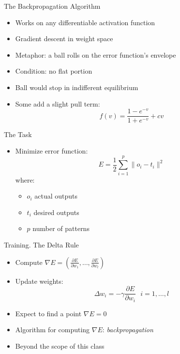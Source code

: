 \documentclass[size=14pt,
  style=tycja,
  paper=screen,
  ]{powerdot}
\begin{document}
\begin{slide}{The Backpropagation Algorithm}
  \begin{itemize}
  \item Works on any differentiable activation function
  \item Gradient descent in weight space
  \item Metaphor: a ball rolls on the error function's envelope
  \item Condition: no flat portion
  \item Ball would stop in indifferent equilibrium
  \item Some add a slight pull term:
  \begin{equation}
    f(v) = \displaystyle\frac{1 - e^{-v}}{1 + e^{-v}} + c v
  \end{equation}
  \end{itemize}
\end{slide}

\begin{slide}{The Task}
  \begin{itemize}
  \item Minimize error function:
    \begin{equation}
      E = \frac{1}{2}\displaystyle\sum_{i=1}^{p}\| o_i - t_i \|^2
    \end{equation}    
    where:
    \begin{itemize}
    \item $o_i$ actual outputs
    \item $t_i$ desired outputs
    \item $p$ number of patterns
    \end{itemize}
    
  \end{itemize}
\end{slide}

\begin{slide}{Training. The Delta Rule}
  \begin{itemize}
  \item Compute $\nabla E = \left(\frac{\partial E}{\partial w_1},\ldots,\frac{\partial E}{\partial w_l}\right)$
  \item Update weights:
    \begin{equation}
      \Delta w_i = -\gamma \frac{\partial E}{\partial w_i} \ \ \ i = 1,\ldots,l
    \end{equation}
  \item Expect to find a point $\nabla E = 0$
  \item Algorithm for computing $\nabla E$: \emph{backpropagation}
  \item Beyond the scope of this class     
  \end{itemize}
\end{slide}
\end{document}
